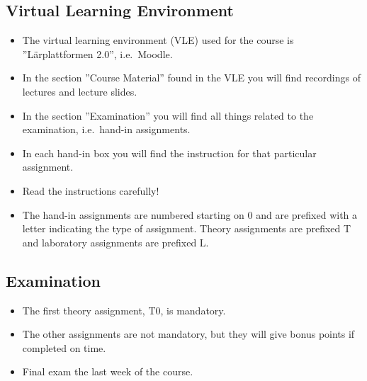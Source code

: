 \documentclass{beamer}
\begin{document}
\subsection{Virtual Learning Environment}

\begin{frame}{\insertsubsectionhead}
  \begin{itemize}
    \item The virtual learning environment (VLE) used for the course is 
      ''Lärplattformen 2.0'', i.e.\ Moodle.

    \item In the section ''Course Material'' found in the VLE you will find 
      recordings of lectures and lecture slides.

    \item In the section ''Examination'' you will find all things related to 
      the examination, i.e.\ hand-in assignments.

    \item In each hand-in box you will find the instruction for that particular 
      assignment.

    \item Read the instructions carefully!

    \item The hand-in assignments are numbered starting on 0 and are prefixed 
      with a letter indicating the type of assignment.
      Theory assignments are prefixed T and laboratory assignments are prefixed 
      L.

  \end{itemize}
\end{frame}

\subsection{Examination}

\begin{frame}{\insertsubsectionhead}
  \begin{itemize}
    \item The first theory assignment, T0, is mandatory.

    \item The other assignments are not mandatory, but they will give bonus 
      points if completed on time.

    \item Final exam the last week of the course.

  \end{itemize}
\end{frame}
\end{document}
